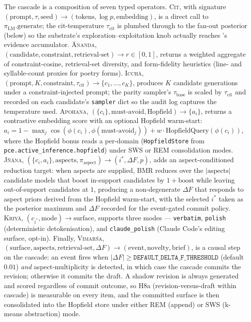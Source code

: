 The cascade is a composition of seven typed operators. \textsc{Cit}, with signature $(\text{prompt}, \tau, \text{seed}) \to (\text{tokens}, \log p, \text{embedding})$, is a direct call to $\pi_{\text{LM}}.\text{generate}$; the cit-temperature $\tau_{\text{cit}}$ is plumbed through to the  fan-out posterior (below) so the substrate's exploration--exploitation knob actually reaches 's evidence accumulator. \textsc{\=Ananda}, $(\text{candidate}, \text{constraint}, \text{retrieval-set}) \to r \in [0,1]$, returns a weighted aggregate of constraint-cosine, retrieval-set diversity, and form-fidelity heuristics (line- and syllable-count proxies for poetry forms). \textsc{Icch\=a}, $(\text{prompt}, K, \text{constraint}, \tau_{\text{cit}}) \to \{c_1, \dots, c_K\}$, produces $K$ candidate generations under a constraint-injected prompt; the parity sampler's $\tau_{\text{base}}$ is scaled by $\tau_{\text{cit}}$ and recorded on each candidate's \texttt{sampler} dict so the audit log captures the temperature used. \textsc{Apohana}, $(\{c_i\}, \text{must-avoid}, \text{Hopfield}) \to \{a_i\}$, returns a contrastive embedding score with an optional Hopfield warm-start: $a_i = 1 - \max_j \cos(\phi(c_i), \phi(\text{must-avoid}_j)) + w \cdot \text{HopfieldQuery}(\phi(c_i))$, where the Hopfield bonus reads a per-domain  (\texttt{HopfieldStore} from \texttt{pce.active\_inference.hopfield}) under SWS or REM consolidation modes. \textsc{J\~n\=ana}, $(\{c_i, a_i\}, \text{aspects}, \pi_{\text{aspect}}) \to (i^*, \Delta F, p)$, adds an aspect-conditioned reduction target: when aspects are supplied, BMR reduces over the $|\text{aspects}|$ candidate models that boost in-support candidates by $1+\text{boost}$ while leaving out-of-support candidates at $1$, producing a non-degenerate $\Delta F$ that responds to aspect priors derived from the Hopfield warm-start, with the selected $i^*$ taken as the posterior maximum and $\Delta F$ recorded for the event-gated commit policy. \textsc{Kriy\=a}, $(c_{i^*}, \text{mode}) \to \text{surface}$, supports three modes --- \texttt{verbatim}, \texttt{polish} (deterministic detokenisation), and \texttt{claude\_polish} (Claude Code's editing surface, opt-in). Finally, \textsc{Vimar\'sa}, $(\text{surface}, \text{aspects}, \text{retrieval-set}, \Delta F) \to (\text{event}, \text{novelty}, \text{brief})$, is a causal step on the cascade: an event fires when $|\Delta F| \geq \texttt{DEFAULT\_DELTA\_F\_THRESHOLD}$ (default $0.01$) \emph{and} aspect-multiplicity is detected, in which case the cascade commits the revision; otherwise it commits the draft. A shadow revision is always generated and scored regardless of commit outcome, so H8a (revision-versus-draft within cascade) is measurable on every item, and the committed surface is then consolidated into the Hopfield store under either REM (append) or SWS (k-means abstraction) mode.

